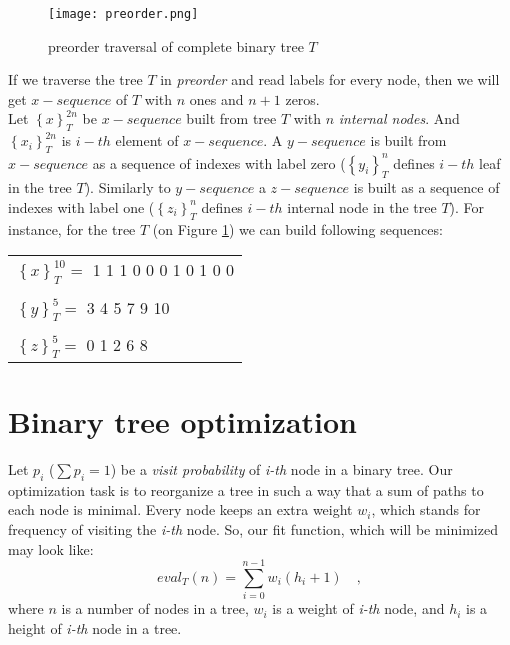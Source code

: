 \documentclass[12pt]{article}
\newcommand{\sumin}[2]{\sum\limits_{#1}^{#2}}
\begin{document}
\begin{figure}[ht]
\centering
\texttt{[image: preorder.png]}
\caption{preorder traversal of complete binary tree $T$}
\label{fig:preorder}
\end{figure}

If we traverse the tree $T$ in \textit{preorder} and read labels for every node, then we will get $x-sequence$ of $T$ with $n$ ones and $n+1$ zeros.\\
Let $\left\{x\right\}_{T}^{2n}$ be $x-sequence$ built from tree $T$ with $n$  \textit{internal nodes}. And $\left\{x_i\right\}_{T}^{2n}$  is $i-th$ element of $x-sequence$.
A $y-sequence$ is built from $x-sequence$ as a sequence of indexes with label zero ($\left\{y_i\right\}_{T}^{n}$ defines $i-th$ leaf in the tree $T$).
Similarly to $y-sequence$ a $z-sequence$ is built as a sequence of indexes with label one ($\left\{z_i\right\}_{T}^{n}$ defines $i-th$ internal node in the tree $T$).
For instance, for the tree $T$ (on Figure \ref{fig:preorder}) we can build following sequences:

\begin{tabular}{l}
    $\left\{x\right\}_{T}^{10} = $ 1 1 1 0 0 0 1 0 1 0 0\\
    \\
    $\left\{y\right\}_{T}^{5} = $ 3 4 5 7 9 10\\
    \\
    $\left\{z\right\}_{T}^{5} = $ 0 1 2 6 8\\
\end{tabular}





\section{Binary tree optimization}
Let $p_i$ ($\sum{p_i} = 1$) be a \textit{visit probability} of \textit{i-th} node in a binary tree. Our optimization task is to reorganize a tree in such a way that a sum of paths to each node is minimal. Every node keeps an extra weight $w_i$, which stands for frequency of visiting the \textit{i-th} node.
So, our fit function, which will be minimized may look like:
\begin{equation}
    eval_{T}(n) = \sumin{i=0}{n-1} w_i (h_i + 1)\quad ,
\end{equation}
where $n$ is a number of nodes in a tree, $w_i$ is a weight of \textit{i-th} node, and $h_i$ is a height of \textit{i-th} node in a tree.
\end{document}
